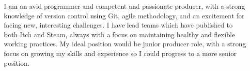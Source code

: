

\begin{cvparagraph}
    I am an avid programmer and competent and passionate producer, with a strong knowledge of version control using Git, agile methodology, and an excitement for facing new, interesting challenges. I have lead teams which have published to both Itch and Steam, always with a focus on maintaining healthy and flexible working practices. My ideal position would be junior producer role, with a strong focus on growing my skills and experience so I could progress to a more senior position.
    
\end{cvparagraph}
